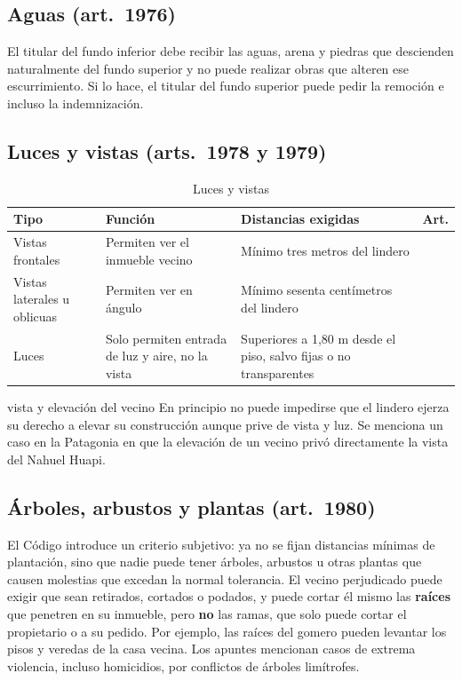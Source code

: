 \documentclass[12pt,oneside]{book}
\begin{document}
\subsection{Aguas (art.~1976)}

El titular del fundo inferior debe recibir las aguas, arena y piedras que descienden naturalmente del fundo superior y no puede realizar obras que alteren ese escurrimiento. Si lo hace, el titular del fundo superior puede pedir la remoción e incluso la indemnización.

\subsection{Luces y vistas (arts.~1978 y 1979)}

\begin{table}[H]
\centering
\small
\begin{tabularx}{\textwidth}{>{\raggedright\arraybackslash}p{}>{\raggedright\arraybackslash}p{}>{\raggedright\arraybackslash}X>{\raggedright\arraybackslash}p{}}
\toprule
\textbf{Tipo} & \textbf{Función} & \textbf{Distancias exigidas} & \textbf{Art.} \\
\midrule
Vistas frontales & Permiten ver el inmueble vecino & Mínimo tres metros del lindero & 1978 \\
Vistas laterales u oblicuas & Permiten ver en ángulo & Mínimo sesenta centímetros del lindero & 1978 \\
Luces & Solo permiten entrada de luz y aire, no la vista & Superiores a 1,80 m desde el piso, salvo fijas o no transparentes & 1979 \\
\bottomrule
\end{tabularx}
\caption{Luces y vistas}
\end{table}

\begin{ejemplo}{vista y elevación del vecino}
En principio no puede impedirse que el lindero ejerza su derecho a elevar su construcción aunque prive de vista y luz. Se menciona un caso en la Patagonia en que la elevación de un vecino privó directamente la vista del Nahuel Huapi.
\end{ejemplo}

\subsection{Árboles, arbustos y plantas (art.~1980)}

El Código introduce un criterio subjetivo: ya no se fijan distancias mínimas de plantación, sino que nadie puede tener árboles, arbustos u otras plantas que causen molestias que excedan la normal tolerancia. El vecino perjudicado puede exigir que sean retirados, cortados o podados, y puede cortar él mismo las \textbf{raíces} que penetren en su inmueble, pero \textbf{no} las ramas, que solo puede cortar el propietario o a su pedido. Por ejemplo, las raíces del gomero pueden levantar los pisos y veredas de la casa vecina. Los apuntes mencionan casos de extrema violencia, incluso homicidios, por conflictos de árboles limítrofes.
\end{document}
